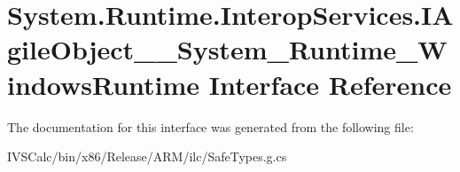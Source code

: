 \hypertarget{interface_system_1_1_runtime_1_1_interop_services_1_1_i_agile_object_____system___runtime___windows_runtime}{}\section{System.\+Runtime.\+Interop\+Services.\+I\+Agile\+Object\+\_\+\+\_\+\+System\+\_\+\+Runtime\+\_\+\+Windows\+Runtime Interface Reference}
\label{interface_system_1_1_runtime_1_1_interop_services_1_1_i_agile_object_____system___runtime___windows_runtime}


The documentation for this interface was generated from the following file\+:\begin{DoxyCompactItemize}
\item 
I\+V\+S\+Calc/bin/x86/\+Release/\+A\+R\+M/ilc/Safe\+Types.\+g.\+cs\end{DoxyCompactItemize}

